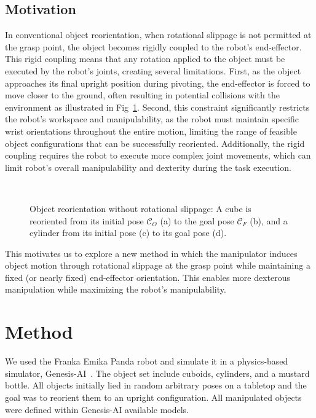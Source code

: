 \documentclass{article}
\begin{document}
\subsection{Motivation}
In conventional object reorientation, when rotational slippage is not permitted at the grasp point, the object becomes rigidly coupled to the robot's end-effector. This rigid coupling means that any rotation applied to the object must be executed by the robot's joints, creating several limitations. First, as the object approaches its final upright position during pivoting, the end-effector is forced to move closer to the ground, often resulting in potential collisions with the environment as illustrated in Fig~\ref{Fig:CubeCylinder_Sclerp}. Second, this constraint significantly restricts the robot's workspace and manipulability, as the robot must maintain specific wrist orientations throughout the entire motion, limiting the range of feasible object configurations that can be successfully reoriented. Additionally, the rigid coupling requires the robot to execute more complex joint movements, which can limit robot's overall 
manipulability and dexterity during the task execution. 
\begin{figure}[!htbp]
\centering
     \quad \,
     \quad \,
    \quad \,
    \caption{Object reorientation without rotational slippage: A cube is reoriented from its initial pose $\mathcal{C}_O$ (a) to the goal pose $\mathcal{C}_F$ (b), and a cylinder from its initial pose (c) to its goal pose (d).}
\label{Fig:CubeCylinder_Sclerp}
\end{figure}

This motivates us to explore a new method in which the manipulator induces object motion through rotational slippage at the grasp point while maintaining a fixed (or nearly fixed) end-effector orientation. This enables more dexterous manipulation while maximizing the robot’s manipulability. 

\section{Method}
We used the Franka Emika Panda robot and simulate it in a physics-based simulator, Genesis-AI~\cite{Genesis}.
The object set include cuboids, cylinders, and a mustard bottle. All objects initially lied in random arbitrary poses on a tabletop and the goal was to reorient them to an upright configuration.
All manipulated objects were defined within Genesis-AI available models.
\end{document}
